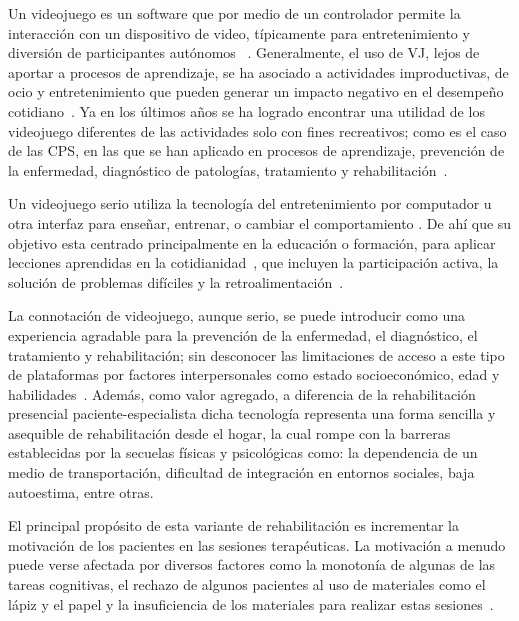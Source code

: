 \begin{introduction}
    \vspace{5pt}
    Un videojuego es un software que por medio de un controlador permite la interacción con un dispositivo
    de video, típicamente para entretenimiento y diversión de participantes autónomos ~\cite{studenski2010interactive, gomez2012videojuegos, gonzalez2016mooc}. 
    Generalmente, el uso de VJ, 
    lejos de aportar a procesos de aprendizaje, se ha asociado a actividades improductivas, de ocio y entretenimiento que pueden 
    generar un impacto negativo en el desempeño cotidiano~\cite{maldonado2014videojuegos}. Ya en los últimos años se ha logrado encontrar una 
    utilidad de los videojuego diferentes de las actividades solo con fines recreativos; como es el caso de las CPS, en las 
    que se han aplicado en procesos de aprendizaje, prevención de la enfermedad, diagnóstico de patologías, 
    tratamiento y rehabilitación~\cite{ladino2021uso}. 

    \vspace{5pt}
    Un videojuego serio utiliza la tecnología del entretenimiento por computador u otra interfaz para enseñar, entrenar, o 
    cambiar el comportamiento . De ahí que su objetivo esta centrado principalmente en la educación o formación, para 
    aplicar lecciones aprendidas en la cotidianidad~\cite{graafland2014serious}, que incluyen la participación activa, la solución de problemas
    difíciles y la retroalimentación~\cite{gee2004learning}.
    
    \vspace{5pt}
    La connotación de videojuego, aunque serio, se puede introducir como una experiencia
    agradable para la prevención de la enfermedad, el diagnóstico, el tratamiento y rehabilitación;
    sin desconocer las limitaciones de acceso a este tipo de plataformas por factores interpersonales
    como estado socioeconómico, edad y habilidades~\cite{ladino2021uso}. Además, como valor agregado,
    a diferencia de la rehabilitación presencial paciente-especialista dicha tecnología representa una 
    forma sencilla y asequible de rehabilitación desde el hogar, la cual rompe con la barreras establecidas 
    por la secuelas físicas y psicológicas como: la dependencia de un medio de transportación, dificultad 
    de integración en entornos sociales, baja autoestima, entre otras.

    \vspace{5pt}
    El principal propósito de esta variante de rehabilitación es incrementar la 
    motivación de los pacientes en las sesiones terapéuticas. La motivación a menudo puede verse afectada 
    por diversos factores como la monotonía de algunas de las tareas cognitivas, el rechazo de algunos 
    pacientes al uso de materiales como el lápiz y el papel y la insuficiencia de los materiales para 
    realizar estas sesiones~\cite{regalon12019juegos}. 


\end{introduction}
